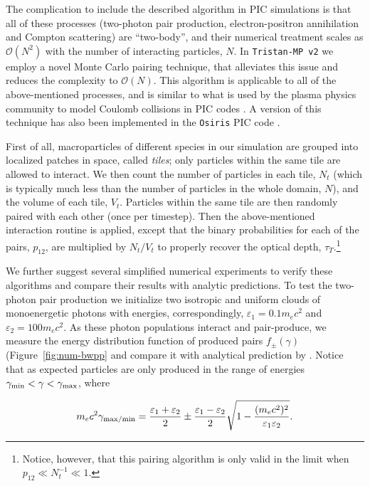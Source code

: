The complication to include the described algorithm in PIC simulations is that all of these processes (two-photon pair production, electron-positron annihilation and Compton scattering) are ``two-body'', and their numerical treatment scales as $\mathcal{O}(N^2)$ with the number of interacting particles, $N$. In \texttt{Tristan-MP v2} we employ a novel Monte Carlo pairing technique, that alleviates this issue and reduces the complexity to $\mathcal{O}(N)$. This algorithm is applicable to all of the above-mentioned processes, and is similar to what is used by the plasma physics community to model Coulomb collisions in PIC codes \citep[see, e.g.,][]{2009shin.confE.163D}. A version of this technique has also been implemented in the \texttt{Osiris} PIC code \citep{2020JPlPh..86e9016D}.

First of all, macroparticles of different species in our simulation are grouped into localized patches in space, called \emph{tiles}; only particles within the same tile are allowed to interact. We then count the number of particles in each tile, $N_t$ (which is typically much less than the number of particles in the whole domain, $N$), and the volume of each tile, $V_t$. Particles within the same tile are then randomly paired with each other (once per timestep). Then the above-mentioned interaction routine is applied, except that the binary probabilities for each of the pairs, $p_{12}$, are multiplied by $N_t / V_t$ to properly recover the optical depth, $\tau_T$.\footnote{Notice, however, that this pairing algorithm is only valid in the limit when $p_{12}\ll N_t^{-1}\ll 1$.}

We further suggest several simplified numerical experiments to verify these algorithms and compare their results with analytic predictions. To test the two-photon pair production we initialize two isotropic and uniform clouds of monoenergetic photons with energies, correspondingly, $\varepsilon_1 = 0.1m_e c^2$ and $\varepsilon_2 = 100 m_e c^2$. As these photon populations interact and pair-produce, we measure the energy distribution function of produced pairs $f_{\pm}(\gamma)$ (Figure~\ref{fig:num-bwpp} and compare it with analytical prediction by \cite{1983Ap.....19..187A}. Notice that as expected particles are only produced in the range of energies $\gamma_{\rm min}<\gamma<\gamma_{\rm max}$, where

\begin{equation}
    m_e c^2 \gamma_{\rm max/min} = \frac{\varepsilon_1 + \varepsilon_2}{2} \pm \frac{\varepsilon_1 - \varepsilon_2}{2}\sqrt{1 - \frac{(m_ec^2)^2}{\varepsilon_1\varepsilon_2}}.
\end{equation}

